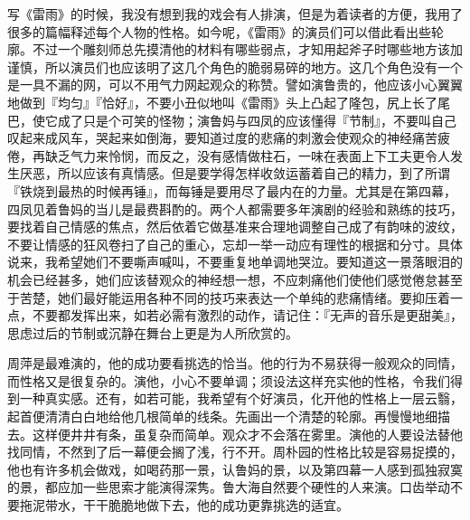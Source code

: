 写《雷雨》的时候，我没有想到我的戏会有人排演，但是为着读者的方便，我用了很多的篇幅释述每个人物的性格。如今呢，《雷雨》的演员们可以借此看出些轮廓。不过一个雕刻师总先摸清他的材料有哪些弱点，才知用起斧子时哪些地方该加谨慎，所以演员们也应该明了这几个角色的脆弱易碎的地方。这几个角色没有一个是一具不漏的网，可以不用气力网起观众的称赞。譬如演鲁贵的，他应该小心翼翼地做到『均匀』『恰好』，不要小丑似地叫《雷雨》头上凸起了隆包，尻上长了尾巴，使它成了只是个可笑的怪物；演鲁妈与四凤的应该懂得『节制』，不要叫自己叹起来成风车，哭起来如倒海，要知道过度的悲痛的刺激会使观众的神经痛苦疲倦，再缺乏气力来怜悯，而反之，没有感情做柱石，一味在表面上下工夫更令人发生厌恶，所以应该有真情感。但是要学得怎样收敛运蓄着自己的精力，到了所谓『铁烧到最热的时候再锤』，而每锤是要用尽了最内在的力量。尤其是在第四幕，四凤见着鲁妈的当儿是最费斟酌的。两个人都需要多年演剧的经验和熟练的技巧，要找着自己情感的焦点，然后依着它做基准来合理地调整自己成了有韵味的波纹，不要让情感的狂风卷扫了自己的重心，忘却一举一动应有理性的根据和分寸。具体说来，我希望她们不要嘶声喊叫，不要重复地单调地哭泣。要知道这一景落眼泪的机会已经甚多，她们应该替观众的神经想一想，不应刺痛他们使他们感觉倦怠甚至于苦楚，她们最好能运用各种不同的技巧来表达一个单纯的悲痛情绪。要抑压着一点，不要都发挥出来，如若必需有激烈的动作，请记住：『无声的音乐是更甜美』，思虑过后的节制或沉静在舞台上更是为人所欣赏的。

周萍是最难演的，他的成功要看挑选的恰当。他的行为不易获得一般观众的同情，而性格又是很复杂的。演他，小心不要单调；须设法这样充实他的性格，令我们得到一种真实感。还有，如若可能，我希望有个好演员，化开他的性格上一层云翳，起首便清清白白地给他几根简单的线条。先画出一个清楚的轮廓。再慢慢地细描去。这样便井井有条，虽复杂而简单。观众才不会落在雾里。演他的人要设法替他找同情，不然到了后一幕便会搁了浅，行不开。周朴园的性格比较是容易捉摸的，他也有许多机会做戏，如喝药那一景，认鲁妈的景，以及第四幕一人感到孤独寂寞的景，都应加一些思索才能演得深隽。鲁大海自然要个硬性的人来演。口齿举动不要拖泥带水，干干脆脆地做下去，他的成功更靠挑选的适宜。

